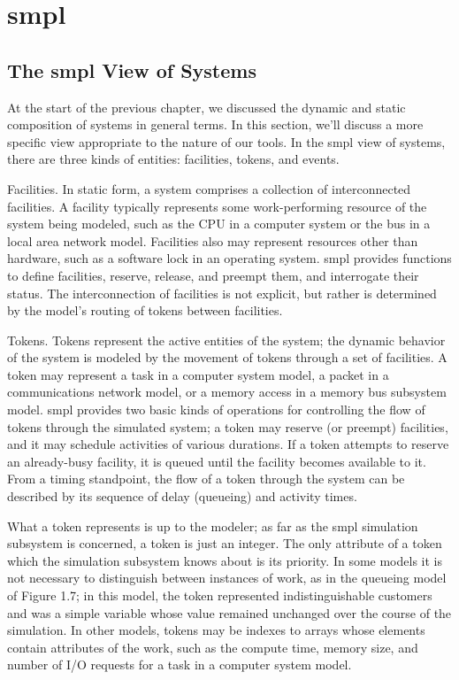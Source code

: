 \chapter{smpl}
\label{chap:smpl}

\section{The smpl View of Systems}
\label{sec:smpl-view-of-systems}

At the start of the previous chapter, we discussed the dynamic and static
composition of systems in general terms. In this section, we'll discuss a more
specific view appropriate to the nature of our tools. In the smpl view of
systems, there are three kinds of entities: facilities, tokens, and events.

Facilities. In static form, a system comprises a collection of interconnected
facilities. A facility typically represents some work-performing resource of
the system being modeled, such as the CPU in a computer system or the bus in a
local area network model. Facilities also may represent resources other than
hardware, such as a software lock in an operating system. smpl provides
functions to define facilities, reserve, release, and preempt them, and
interrogate their status. The interconnection of facilities is not explicit,
but rather is determined by the model's routing of tokens between facilities.

Tokens. Tokens represent the active entities of the system; the dynamic
behavior of the system is modeled by the movement of tokens through a set of
facilities. A token may represent a task in a computer system model, a packet
in a communications network model, or a memory access in a memory bus
subsystem model. smpl provides two basic kinds of operations for controlling
the flow of tokens through the simulated system; a token may reserve (or
preempt) facilities, and it may schedule activities of various durations. If a
token attempts to reserve an already-busy facility, it is queued until the
facility becomes available to it. From a timing standpoint, the flow of a
token through the system can be described by its sequence of delay (queueing)
and activity times.

What a token represents is up to the modeler; as far as the smpl simulation
subsystem is concerned, a token is just an integer. The only attribute of a
token which the simulation subsystem knows about is its priority. In some
models it is not necessary to distinguish between instances of work, as in the
queueing model of Figure 1.7; in this model, the token represented
indistinguishable customers and was a simple variable whose value remained
unchanged over the course of the simulation. In other models, tokens may be
indexes to arrays whose elements contain attributes of the work, such as the
compute time, memory size, and number of I/O requests for a task in a computer
system model.

